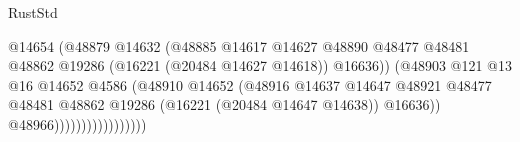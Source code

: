 \begin{lexlean}{RustStd}
\begin{coremodule}
                                                                  @14654
                                                                  (@48879
                                                                    @14632
                                                                    (@48885
                                                                      @14617
                                                                      @14627
                                                                      @48890
                                                                      @48477
                                                                      @48481
                                                                      @48862
                                                                      @19286
                                                                      (@16221
                                                                        (@20484 @14627 @14618))
                                                                      @16636))
                                                                  (@48903
                                                                    @121
                                                                    @13
                                                                    @16
                                                                    @14652
                                                                    @4586
                                                                    (@48910
                                                                      @14652
                                                                      (@48916
                                                                        @14637
                                                                        @14647
                                                                        @48921
                                                                        @48477
                                                                        @48481
                                                                        @48862
                                                                        @19286
                                                                        (@16221
                                                                          (@20484 @14647 @14638))
                                                                        @16636))
                                                                    @48966)))))))))))))))))

\end{coremodule}
\end{lexlean}
